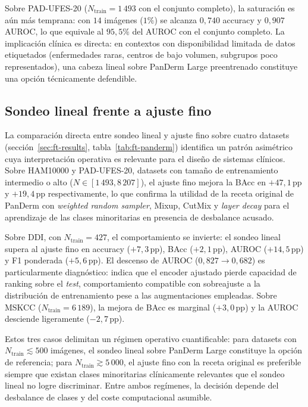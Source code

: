 Sobre PAD-UFES-20 ($N_{\mathrm{train}} = 1\,493$ con el conjunto
completo), la saturación es aún más temprana: con $14$ imágenes
($1\%$) se alcanza $0{,}740$ accuracy y $0{,}907$ AUROC, lo
que equivale al $95{,}5\%$ del AUROC con el conjunto completo. La
implicación clínica es directa: en contextos con disponibilidad
limitada de datos etiquetados (enfermedades raras, centros de bajo
volumen, subgrupos poco representados), una cabeza lineal sobre
PanDerm Large preentrenado constituye una opción técnicamente
defendible.

\subsection{Sondeo lineal frente a ajuste fino}
\label{sec:disc-lp-vs-ft}

La comparación directa entre sondeo lineal y ajuste fino sobre
cuatro datasets (secci\'on~\ref{sec:ft-results},
tabla~\ref{tab:ft-panderm}) identifica un patrón asimétrico cuya
interpretación operativa es relevante para el diseño de sistemas
clínicos. Sobre HAM10000 y PAD-UFES-20, datasets con tamaño de
entrenamiento intermedio o alto ($N \in [1\,493, 8\,207]$), el
ajuste fino mejora la BAcc en $+47{,}1$\,pp y $+19{,}4$\,pp
respectivamente, lo que confirma la utilidad de la receta original
de PanDerm con \emph{weighted random sampler}, Mixup, CutMix y
\emph{layer decay} para el aprendizaje de las clases minoritarias
en presencia de desbalance acusado.

Sobre DDI, con $N_{\mathrm{train}} = 427$, el comportamiento se
invierte: el sondeo lineal supera al ajuste fino en accuracy
($+7{,}3$\,pp), BAcc ($+2{,}1$\,pp), AUROC
($+14{,}5$\,pp) y F1 ponderada ($+5{,}6$\,pp). El descenso
de AUROC ($0{,}827 \to 0{,}682$) es particularmente diagnóstico:
indica que el encoder ajustado pierde capacidad de ranking sobre el
\emph{test}, comportamiento compatible con sobreajuste a la
distribución de entrenamiento pese a las augmentaciones
empleadas. Sobre MSKCC ($N_{\mathrm{train}} = 6\,189$), la mejora
de BAcc es marginal ($+3{,}0$\,pp) y la AUROC desciende
ligeramente ($-2{,}7$\,pp).

Estos tres casos delimitan un régimen operativo cuantificable:
para datasets con $N_{\mathrm{train}} \lesssim 500$ imágenes,
el sondeo lineal sobre PanDerm Large constituye la opción de
referencia; para $N_{\mathrm{train}} \gtrsim 5\,000$, el ajuste
fino con la receta original es preferible siempre que existan
clases minoritarias clínicamente relevantes que el sondeo lineal
no logre discriminar. Entre ambos regímenes, la decisión depende
del desbalance de clases y del coste computacional asumible.


